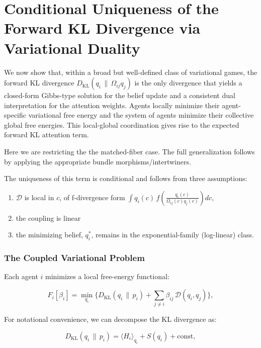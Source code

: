 \documentclass[11pt]{article}
\begin{document}
\section{Conditional Uniqueness of the Forward KL Divergence via Variational Duality}

We now show that, within a broad but well-defined class of variational games, the forward KL divergence $D_{\mathrm{KL}}(q_i \,\|\, \Omega_{ij} q_j)$ is the only divergence that yields a closed-form Gibbs-type solution for the belief update and a consistent dual interpretation for the attention weights.  Agents locally minimize their agent-specific variational free energy and the system of agents minimize their collective global free energies.  This local-global coordination gives rise to the expected forward KL attention term.

Here we are restricting the the matched-fiber case.  The full generalization follows by applying the appropriate bundle morphisms/intertwiners.

The uniqueness of this term is conditional and follows from three assumptions:

\begin{enumerate}
  \item $\mathcal{D}$ is local in $c$, of f-divergence form $\displaystyle \int q_i(c)\, f\!\left(\frac{q_i(c)}{\Omega_{ij}(c) q_j(c)}\right) dc$,
  \item the coupling is linear
  \item the minimizing belief, $q_i^*$, remains in the exponential-family (log-linear) class.
\end{enumerate}

\subsubsection{The Coupled Variational Problem}
Each agent $i$ minimizes a local free-energy functional:

\begin{equation}
F_i[\beta_i]
=\min_{q_i}
\Big\{
D_{\mathrm{KL}}(q_i \,\|\, p_i)
+ \sum_{j\neq i} \beta_{ij}\,\mathcal{D}(q_i,q_j)
\Big\},
\label{eq:F_i}
\end{equation}

For notational convenience, we can decompose the KL divergence as:

\begin{equation}
D_{\mathrm{KL}}(q_i \,\|\, p_i) = \langle H_i \rangle_{q_i} + S(q_i) + \text{const},
\end{equation}
\end{document}
